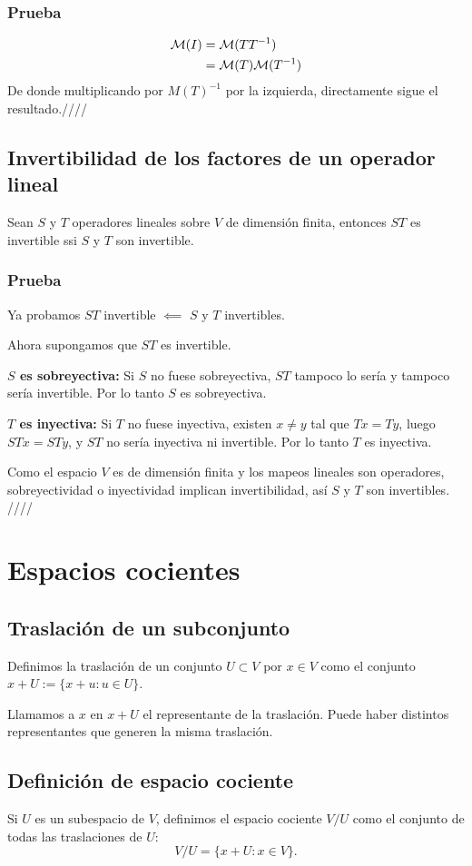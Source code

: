 \documentclass{article}
\begin{document}
\subsubsection*{Prueba}
\begin{align*}
    \mathcal{M}(I)&=\mathcal{M}(TT^{-1})\\
    &=\mathcal{M}(T)\mathcal{M}(T^{-1})
\end{align*}
De donde multiplicando por $M(T)^{-1}$ por la izquierda,
directamente sigue el resultado.\hfill ////

\subsection{Invertibilidad de los factores de un operador lineal}
Sean $S$ y $T$ operadores lineales sobre $V$ de dimensión finita,
entonces $ST$ es invertible ssi $S$ y $T$ son invertible.
\subsubsection*{Prueba}
Ya probamos $ST$ invertible $\impliedby$ $S$ y $T$ invertibles.

Ahora supongamos que $ST$ es invertible.

\textbf{$S$ es sobreyectiva:} Si $S$ no fuese sobreyectiva, $ST$ tampoco lo sería y tampoco sería
invertible. Por lo tanto $S$ es sobreyectiva.

\textbf{$T$ es inyectiva:} Si $T$ no fuese inyectiva, existen $x\neq y$ tal que $Tx=Ty$,
luego $STx=STy$, y $ST$ no sería inyectiva ni invertible. Por lo
tanto $T$ es inyectiva.

Como el espacio $V$ es de dimensión finita y los mapeos lineales son 
operadores, sobreyectividad o inyectividad implican invertibilidad, así 
$S$ y $T$ son invertibles.
\hfill ////
\newpage

\section{Espacios cocientes}
\subsection{Traslación de un subconjunto}
Definimos la traslación de un conjunto $U\subset V$ por $x\in V$ como
el conjunto $x+U:=\{x+u: u\in U\}$.

Llamamos a $x$ en $x+U$ el representante de la traslación. Puede haber distintos representantes que generen la misma traslación.

\subsection{Definición de espacio cociente}
Si $U$ es un subespacio de $V$, definimos el espacio cociente
$V/U$ como el conjunto de todas las traslaciones de $U$:
$$V/U=\{x+U:x\in V\}.$$
\end{document}
